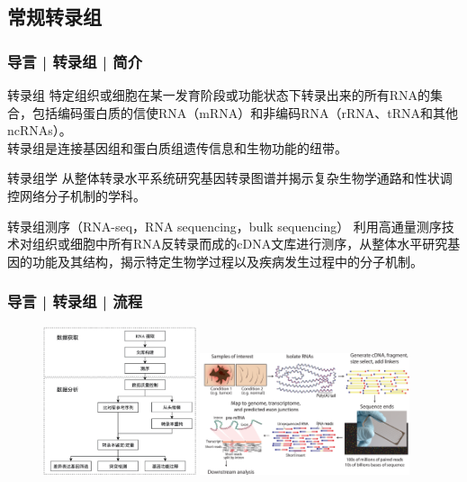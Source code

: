 \documentclass[11pt]{ctexbeamer}
\begin{document}
\subsection{常规转录组}
\begin{frame}
  \frametitle{导言 | 转录组 | 简介}
  \begin{block}{转录组}
    特定组织或细胞在某一发育阶段或功能状态下转录出来的所有RNA的集合，包括编码蛋白质的信使RNA（mRNA）和非编码RNA（rRNA、tRNA和其他ncRNAs）。\\
    转录组是连接基因组和蛋白质组遗传信息和生物功能的纽带。
  \end{block}
  \pause
  \begin{block}{转录组学}
    从整体转录水平系统研究基因转录图谱并揭示复杂生物学通路和性状调控网络分子机制的学科。
  \end{block}
  \pause
  \begin{block}{转录组测序（RNA-seq，RNA sequencing，bulk sequencing）}
利用高通量测序技术对组织或细胞中所有RNA反转录而成的cDNA文库进行测序，从整体水平研究基因的功能及其结构，揭示特定生物学过程以及疾病发生过程中的分子机制。
  \end{block}
\end{frame}
\begin{frame}
  \frametitle{导言 | 转录组 | 流程}
  \begin{figure}
    \centering
    \includegraphics[width=0.4\textwidth]{RNAseq_workflow_1.png}
    \includegraphics[width=0.55\textwidth]{RNAseq_workflow_2.png}
  \end{figure}
\end{frame}
\end{document}
